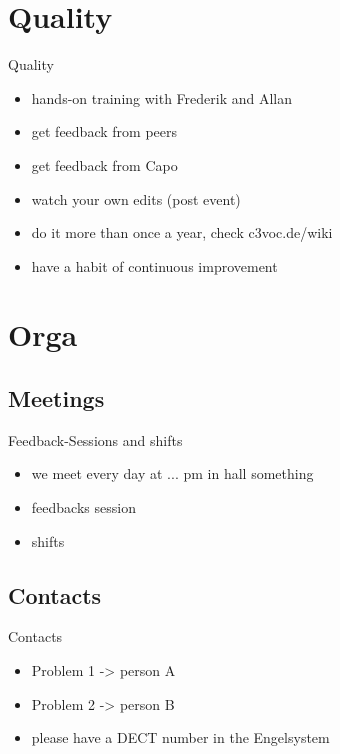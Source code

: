 \documentclass[hyperref={pdfpagelabels=false}]{beamer}
\begin{document}
\section{Quality} 
\begin{frame}{Quality}
\begin{itemize}[<+->]
\item  hands-on training with Frederik and Allan %
\item  get feedback from peers %
\item  get feedback from Capo %
\item  watch your own edits (post event) %
\item  do it more than once a year, check c3voc.de/wiki %
\item  have a habit of continuous improvement %
\end{itemize} 
\end{frame}

\section{Orga} 
\subsection{Meetings}
\begin{frame}{Feedback-Sessions and shifts}
\begin{itemize}
\item  we meet every day at ... pm in hall something
\item  feedbacks session
\item  shifts
\end{itemize} 
\end{frame}

\subsection{Contacts}
\begin{frame}{Contacts}
\begin{itemize}
\item  Problem 1 -> person A
\item  Problem 2 -> person B
\item  please have a DECT number in the Engelsystem
\end{itemize} 
\end{frame}
\end{document}

